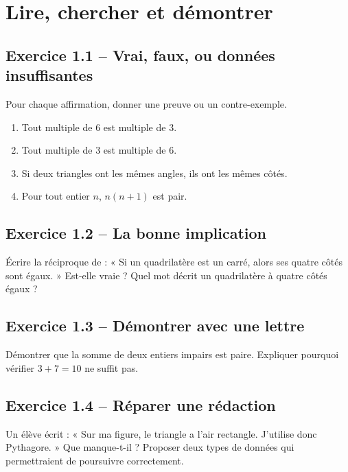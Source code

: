 \chapter{Lire, chercher et démontrer}
\label{exercices:01}
\section*{Exercice 1.1 -- Vrai, faux, ou données insuffisantes}
Pour chaque affirmation, donner une preuve ou un contre-exemple.
\begin{enumerate}\item Tout multiple de $6$ est multiple de $3$.
\item Tout multiple de $3$ est multiple de $6$.
\item Si deux triangles ont les mêmes angles, ils ont les mêmes côtés.
\item Pour tout entier $n$, $n(n+1)$ est pair.\end{enumerate}

\section*{Exercice 1.2 -- La bonne implication}
Écrire la réciproque de : « Si un quadrilatère est un carré, alors ses quatre côtés sont égaux. » Est-elle vraie ? Quel mot décrit un quadrilatère à quatre côtés égaux ?

\section*{Exercice 1.3 -- Démontrer avec une lettre}
Démontrer que la somme de deux entiers impairs est paire. Expliquer pourquoi vérifier $3+7=10$ ne suffit pas.

\section*{Exercice 1.4 -- Réparer une rédaction}
Un élève écrit : « Sur ma figure, le triangle a l'air rectangle. J'utilise donc Pythagore. » Que manque-t-il ? Proposer deux types de données qui permettraient de poursuivre correctement.

